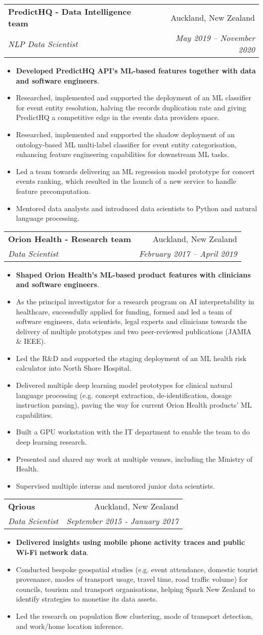 \documentclass[letterpaper,11pt]{article}
\makeatletter
\newcommand{\resumeItemBis}[2]{
  \item\small{
    \textbf{#1}{#2 \vspace{-2pt}}
  }
}
\newcommand{\resumeSubheading}[4]{
  \vspace{-1pt}\item
    \begin{tabular*}{0.97\textwidth}[t]{l@{\extracolsep{\fill}}r}
      \textbf{#1} & #2 \\
      \textit{\small#3} & \textit{\small #4} \\
    \end{tabular*}\vspace{-5pt}
}
\newcommand{\resumeItemListStart}{\begin{itemize}}
\newcommand{\resumeItemListEnd}{\end{itemize}\vspace{-5pt}}
\makeatother
\begin{document}
	\resumeSubheading
      {PredictHQ - Data Intelligence team}{Auckland, New Zealand}
      {NLP Data Scientist}{May 2019 -- November 2020}
      \resumeItemListStart
        \resumeItemBis{Developed PredictHQ API's ML-based features together with data and software engineers}{.}
          \resumeItemBis{} {Researched, implemented and supported the deployment of an ML classifier for event entity resolution, halving the records duplication rate and giving PredictHQ a competitive edge in the events data providers space.}
          \resumeItemBis{} {Researched, implemented and supported the shadow deployment of an ontology-based ML multi-label classifier for event entity categorisation, enhancing feature engineering capabilities for downstream ML tasks.}
          \resumeItemBis{} {Led a team towards delivering an ML regression model prototype for concert events ranking, which resulted in the launch of a new service to handle feature precomputation.}
          \resumeItemBis{} {Mentored data analysts and introduced data scientists to Python and natural language processing.}
        \resumeItemListEnd	
	
    \resumeSubheading
      {Orion Health - Research team}{Auckland, New Zealand}
      {Data Scientist}{February 2017 -- April 2019}
      \resumeItemListStart
        \resumeItemBis{Shaped Orion Health’s ML-based product features with clinicians and software engineers}{.}
        \resumeItemBis{} {As the principal investigator for a research program on AI interpretability in healthcare, successfully applied for funding, formed and led a team of software engineers, data scientists, legal experts and clinicians towards the delivery of multiple prototypes and two peer-reviewed publications (JAMIA \& IEEE).}
        \resumeItemBis{} {Led the R\&D and supported the staging deployment of an ML health risk calculator into North Shore Hospital.}
        \resumeItemBis{} {Delivered multiple deep learning model prototypes for clinical natural language processing (e.g. concept extraction, de-identification, dosage instruction parsing), paving the way for current Orion Health products' ML capabilities.}
        \resumeItemBis{} {Built a GPU workstation with the IT department to enable the team to do deep learning research.}
        \resumeItemBis{} {Presented and shared my work at multiple venues, including the Ministry of Health.}
        \resumeItemBis{} {Supervised multiple interns and mentored junior data scientists.}
      \resumeItemListEnd

    \resumeSubheading
      {Qrious}{Auckland, New Zealand}
      {Data Scientist}{September 2015 - January 2017}
      \resumeItemListStart
        \resumeItemBis{Delivered insights using mobile phone activity traces and public Wi-Fi network data}{.}
        \resumeItemBis{} {Conducted bespoke geospatial studies (e.g. event attendance, domestic tourist provenance, modes of transport usage, travel time, road traffic volume) for councils, tourism and transport organisations, helping Spark New Zealand to identify strategies to monetise its data assets.}
        \resumeItemBis{} {Led the research on population flow clustering, mode of transport detection, and work/home location inference.}
      \resumeItemListEnd
\end{document}
